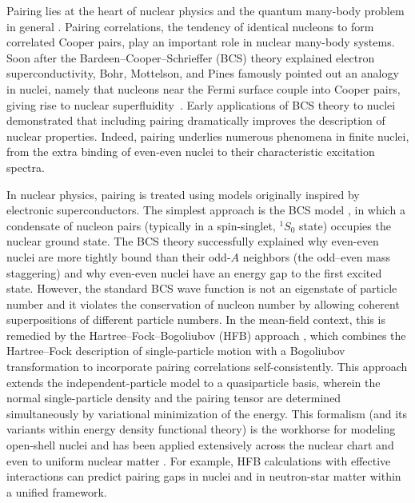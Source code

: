 

Pairing lies at the heart of nuclear physics and the quantum
many-body problem in general \cite{ring_nuclear_1980,richardson_restricted_1963,dean_pairing_2003}.
Pairing correlations, the tendency of identical nucleons to form correlated Cooper pairs, play an important role in  nuclear many-body systems.  Soon after the Bardeen–Cooper–Schrieffer (BCS) theory explained electron superconductivity, Bohr, Mottelson, and Pines famously pointed out an analogy in nuclei, namely that nucleons near the Fermi surface couple into Cooper pairs, giving rise to nuclear superfluidity~\cite{bohr_possible_1958}.  Early applications of BCS theory to nuclei demonstrated that including pairing dramatically improves the description of nuclear properties. Indeed, pairing underlies numerous phenomena in finite nuclei, from the extra binding of even-even nuclei to their characteristic excitation spectra. 

In nuclear physics, pairing is treated using models originally inspired by electronic superconductors. The simplest approach is the BCS model \cite{richardson_restricted_1963,bohr_possible_1958}, in which a condensate of nucleon pairs (typically in a spin-singlet, $^1S_0$ state) occupies the nuclear ground state. The BCS theory successfully explained why even-even nuclei are more tightly bound than their odd-$A$ neighbors (the odd–even mass staggering) and why even-even nuclei have an energy gap to the first excited state. However, the standard BCS wave function is not an eigenstate of particle number and it violates the conservation of nucleon number by allowing coherent superpositions of different particle numbers. In the mean-field context, this is remedied by the Hartree–Fock–Bogoliubov (HFB) approach \cite{Dobaczewski2002}, which combines the Hartree–Fock description of single-particle motion with a Bogoliubov transformation to incorporate pairing correlations self-consistently. This approach extends the independent-particle model to a quasiparticle basis, wherein the normal single-particle density and the pairing tensor are determined simultaneously by variational minimization of the energy. This formalism (and its variants within energy density functional theory) is the workhorse for modeling open-shell nuclei and has been applied extensively across the nuclear chart and even to uniform nuclear matter . For example, HFB calculations with effective interactions can predict pairing gaps in nuclei and in neutron-star matter within a unified framework.

